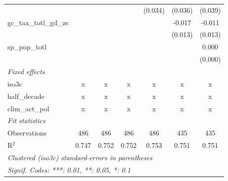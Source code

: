 \begin{tabular}{lcccccc}
                                                         &         &                &                & (0.034)        & (0.036)        & (0.039)\\   
   gc\_tax\_totl\_gd\_zs                                 &         &                &                &                & -0.017         & -0.011\\   
                                                         &         &                &                &                & (0.013)        & (0.013)\\   
   sp\_pop\_totl                                         &         &                &                &                &                & 0.000\\   
                                                         &         &                &                &                &                & (0.000)\\   
   \emph{Fixed effects}\\
   iso3c                                                 & x       & x              & x              & x              & x              & x\\  
   half\_decade                                          & x       & x              & x              & x              & x              & x\\  
   clim\_act\_pol                                        & x       & x              & x              & x              & x              & x\\  
   \midrule \emph{Fit statistics}\\
   Observations                                          & 486     & 486            & 486            & 486            & 435            & 435\\  
   R$^2$                                                 & 0.747   & 0.752          & 0.752          & 0.753          & 0.751          & 0.751\\  
   \midrule
   \multicolumn{7}{l}{\emph{Clustered (iso3c) standard-errors in parentheses}}\\
   \multicolumn{7}{l}{\emph{Signif. Codes: ***: 0.01, **: 0.05, *: 0.1}}\\
\end{tabular}
\par\endgroup


